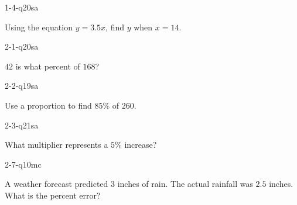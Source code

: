 
\begin{practiceQuestion}{1-4-q20}{sa}
\begin{questionText}
Using the equation $y = 3.5x$, find $y$ when $x = 14$.
\end{questionText}
\end{practiceQuestion}

\begin{practiceQuestion}{2-1-q20}{sa}
\begin{questionText}
$42$ is what percent of $168$?
\end{questionText}
\end{practiceQuestion}

\begin{practiceQuestion}{2-2-q19}{sa}
\begin{questionText}
Use a proportion to find $85\%$ of $260$.
\end{questionText}
\end{practiceQuestion}

\begin{practiceQuestion}{2-3-q21}{sa}
\begin{questionText}
What multiplier represents a $5\%$ increase?
\end{questionText}
\end{practiceQuestion}

\begin{practiceQuestion}{2-7-q10}{mc}
\begin{questionText}
A weather forecast predicted $3$ inches of rain. The actual rainfall was $2.5$ inches. What is the percent error?
\end{questionText}
\end{practiceQuestion}

